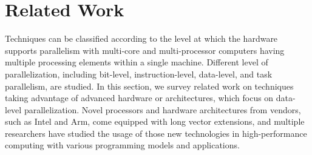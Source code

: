 \documentclass[5p,times,twocolumn]{elsarticle}
\begin{document}
\section{Related Work}\label{sec:related}
Techniques can be classified according to the level at which
the hardware supports parallelism with multi-core and multi-processor computers having
multiple processing elements within a single machine. Different level of parallelization,
including bit-level, instruction-level, data-level, and task parallelism, are studied.
%
In this section, we survey related work on techniques taking advantage of
advanced hardware or architectures, which focus on data-level parallelization.
Novel processors and hardware architectures from vendors, such as Intel and Arm,
come equipped with long vector extensions, and multiple researchers have studied the usage
of those new technologies in high-performance computing with various programming models and applications.
%
\end{document}
